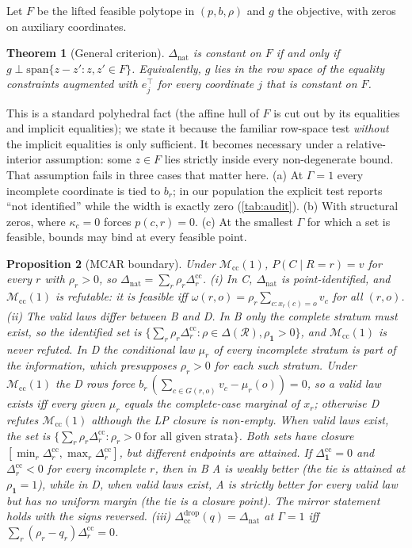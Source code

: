 \documentclass{article}
\theoremstyle{plain}
\newtheorem{theorem}{Theorem}
\newtheorem{proposition}[theorem]{Proposition}
\theoremstyle{definition}
\theoremstyle{remark}
\newcommand{\one}{\mathbf{1}}
\newcommand{\cR}{\mathcal{R}}
\newcommand{\Dnat}{\Delta_{\mathrm{nat}}}
\newcommand{\Mcc}{\mathcal{M}_{\mathrm{cc}}}
\begin{document}
Let $F$ be the lifted feasible polytope in $(p,b,\rho)$ and
$g$ the objective, with zeros on auxiliary coordinates.

\begin{theorem}[General criterion]\label{thm:general}
$\Dnat$ is constant on $F$ if and only if $g\perp\mathrm{span}\{z-z':z,z'\in F\}$.
Equivalently, $g$ lies in the row space of the equality constraints augmented
with $e_j^\top$ for every coordinate $j$ that is constant on $F$.
\end{theorem}
This is a standard polyhedral fact (the affine hull of $F$ is cut out by its
equalities and implicit equalities); we state it because the familiar
row-space test \emph{without} the implicit equalities is only sufficient.
It becomes necessary under a relative-interior assumption: some $z\in F$ lies
strictly inside every non-degenerate bound. That assumption fails in three
cases that matter here. (a) At $\Gamma=1$ every incomplete coordinate is tied
to $b_r$; in our population the explicit test reports ``not identified''
while the width is exactly zero (\cref{tab:audit}). (b) With structural zeros,
where $\kappa_c=0$ forces $p(c,r)=0$. (c) At the smallest $\Gamma$ for which
a set is feasible, bounds may bind at every feasible point.

\begin{proposition}[MCAR boundary]\label{prop:gamma1}
Under $\Mcc(1)$, $P(C\mid R=r)=v$ for every $r$ with $\rho_r>0$, so
$\Dnat=\sum_r\rho_r\Delta^{\mathrm{cc}}_r$.
(i) In C, $\Dnat$ is point-identified, and $\Mcc(1)$ is refutable: it is
feasible iff $\omega(r,o)=\rho_r\sum_{c:x_r(c)=o}v_c$ for all $(r,o)$.
(ii) The valid laws differ between B and D. In B only the complete stratum
must exist, so the identified set is
$\{\sum_r\rho_r\Delta^{\mathrm{cc}}_r:\rho\in\Delta(\cR),\rho_{\one}>0\}$, and
$\Mcc(1)$ is never refuted. In D the conditional law $\mu_r$ of every
incomplete stratum is part of the information, which presupposes $\rho_r>0$
for each such stratum. Under $\Mcc(1)$ the D rows force
$b_r\,(\sum_{c\in G(r,o)}v_c-\mu_r(o))=0$, so a valid law exists iff every given
$\mu_r$ equals the complete-case marginal of $x_r$; otherwise D refutes
$\Mcc(1)$ although the LP closure is non-empty. When valid laws exist, the
set is $\{\sum_r\rho_r\Delta^{\mathrm{cc}}_r:\rho_r>0\ \text{for all given
strata}\}$. Both sets have closure
$[\min_r\Delta^{\mathrm{cc}}_r,\max_r\Delta^{\mathrm{cc}}_r]$, but different
endpoints are attained. If $\Delta^{\mathrm{cc}}_{\one}=0$ and
$\Delta^{\mathrm{cc}}_r<0$ for every incomplete $r$, then in B A is
\emph{weakly} better (the tie is attained at $\rho_{\one}=1$), while in D, when
valid laws exist, A is strictly better for every valid law but has no uniform
margin (the tie is a closure point). The mirror statement holds with the
signs reversed.
(iii) $\Delta^{\mathrm{drop}}_{\mathrm{cc}}(q)=\Dnat$ at $\Gamma=1$ iff
$\sum_r(\rho_r-q_r)\Delta^{\mathrm{cc}}_r=0$.
\end{proposition}
\end{document}
